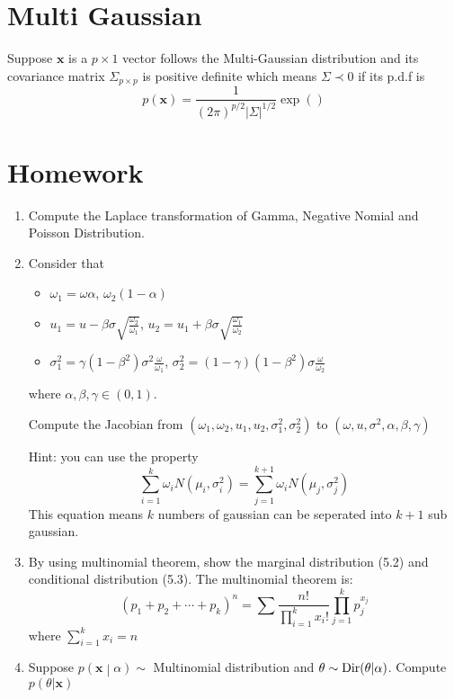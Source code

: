 \section{Multi Gaussian}
	\begin{definition}
		Suppose $\textbf{x}$ is a $p\times 1$ vector follows the Multi-Gaussian distribution and its covariance matrix $\Sigma_{p\times p}$ is positive definite which means $\Sigma\prec0$ if its p.d.f is
		\begin{equation}
			p(\textbf{x}) = \frac{1}{(2\pi)^{p/2}|\Sigma|^{1/2}}\exp\left(\right)
		\end{equation}
	\end{definition}


\section{Homework}
	\begin{enumerate}
		\item Compute the Laplace transformation of Gamma, Negative Nomial and Poisson Distribution.
		
		\item Consider that 
		\begin{itemize}
			\item $\omega_1 = \omega \alpha$, $\omega_2(1-\alpha)$
			\item $u_1 = u-\beta \sigma \sqrt{\frac{\omega_2}{\omega_1}}$, $u_2 = u_1+\beta \sigma \sqrt{\frac{\omega_1}{\omega_2}}$
			\item $\sigma_1^2 = \gamma(1-\beta^2)\sigma^2\frac{\omega}{\omega_1}$, $\sigma^2_2 = (1-\gamma)(1-\beta^2)\sigma\frac{\omega}{\omega_2}$
		\end{itemize}
	where $\alpha, \beta, \gamma \in (0, 1)$.
	
	Compute the Jacobian from $(\omega_1, \omega_2, u_1, u_2, \sigma_1^2, \sigma_2^2)$ to $(\omega, u, \sigma^2, \alpha, \beta, \gamma)$
	
	Hint: you can use the property $$\sum_{i = 1}^{k} \omega_i  N(\mu_i, \sigma_i^2) = \sum_{j=1}^{k+1}\omega_i N(\mu_j, \sigma_j^2)$$
	This equation means $k$ numbers of gaussian can be seperated into $k+1$ sub gaussian.
	
	\item By using multinomial theorem, show the marginal distribution (5.2) and conditional distribution (5.3). 
	The multinomial theorem is:
	$$(p_1+p_2+\cdots +p_k)^n = \sum \frac{n!}{\prod_{i = 1}^{k}x_i!}\prod_{j = 1}^{k}p_j^{x_j}$$
	where $\sum_{i = 1}^{k} x_i = n$
	
	\item Suppose $p\left(\textbf{x}\middle| \alpha\right)\sim $ Multinomial distribution and $\theta\sim \mathrm{Dir}(\theta|\alpha)$. Compute $p(\theta|\textbf{x})$
	\end{enumerate}